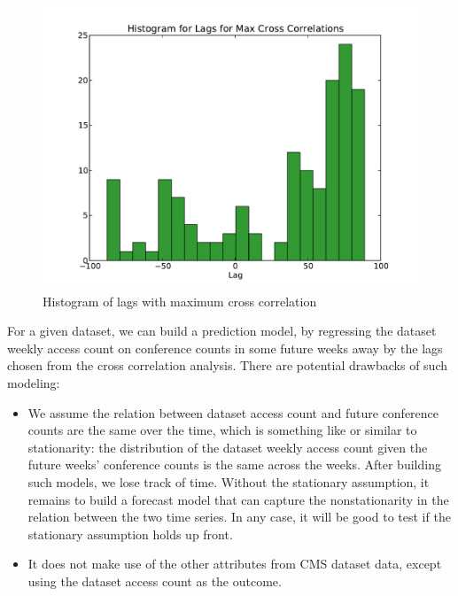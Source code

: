 \documentclass[preprint, 12pt]{elsarticle}
\begin{document}
\begin{figure}
\begin{center}
\includegraphics[scale=0.5]{../data/timeseries/datasets/lag_144_hist.pdf}
\end{center}
\caption{Histogram of lags with maximum cross correlation}
\label{laghist}
\end{figure}

For a given dataset, we can build a prediction model, by regressing the dataset weekly access count on conference counts in some future weeks away by the lags chosen from the cross correlation analysis.
There are potential drawbacks of such modeling:

\begin{itemize}
  
\item We assume the relation between dataset access count and future conference counts are the same over the time, which is something like or similar to stationarity: the distribution of the dataset weekly access count given the future weeks' conference counts is the same across the weeks. After building such models, we lose track of time.
Without the stationary assumption, it remains to build a forecast model that can capture the nonstationarity in the relation between the two time series.
In any case, it will be good to test if the stationary assumption holds up front.

\item It does not make use of the other attributes from CMS dataset data, except using the dataset access count as the outcome.

\end{itemize}
\end{document}
